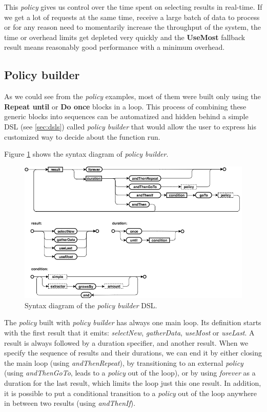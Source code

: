 This \textit{policy} gives us control over the time spent on selecting results in real-time. If we get a lot of requests at the same time, receive a large batch of data to process or for any reason need to momentarily increase the throughput of the system, the time or overhead limits get depleted very quickly and the \textbf{UseMost} fallback result means reasonably good performance with a minimum overhead.

\subsection{Policy builder}

As we could see from the \textit{policy} examples, most of them were built only using the \textbf{Repeat until} or \textbf{Do once} blocks in a loop. This process of combining these generic blocks into sequences can be automatized and hidden behind a simple DSL (see \ref{sec:dsls}) called \textit{policy builder} that would allow the user to express his customized way to decide about the function run.

Figure \ref{fig:policy_builder_chart} shows the syntax diagram of \textit{policy builder}.

\begin{figure}[h!]
	\captionsetup{justification=centering,margin=0.5cm}
	\centerline{\mbox{\includegraphics[width=140mm]{./img/policy_builder_chart.png}}}
	\caption{Syntax diagram of the \textit{policy builder} DSL.}
	\label{fig:policy_builder_chart}
\end{figure}

The \textit{policy} built with \textit{policy builder} has always one main loop. Its definition starts with the first result that it emits: \textit{selectNew}, \textit{gatherData}, \textit{useMost} or \textit{useLast}. A result is always followed by a duration specifier, and another result. When we specify the sequence of results and their durations, we can end it by either closing the main loop (using \textit{andThenRepeat}), by transitioning to an external \textit{policy} (using \textit{andThenGoTo}, leads to a \textit{policy} out of the loop), or by using \textit{forever} as a duration for the last result, which limits the loop just this one result. In addition, it is possible to put a conditional transition to a \textit{policy} out of the loop anywhere in between two results (using \textit{andThenIf}).

